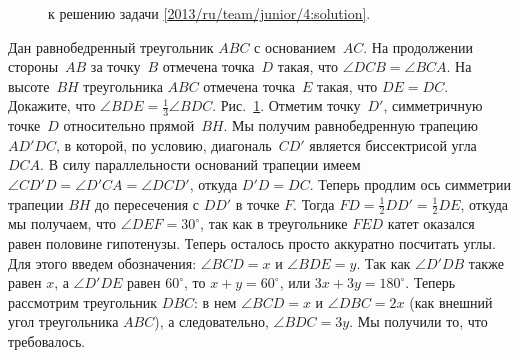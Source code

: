 \ifsolution
\begin{figure}\centering
    \caption{к решению задачи \ref{2013/ru/team/junior/4:solution}.}
    \label{2013/ru/team/junior/4:solution:fig}
\end{figure}%
\fi %

\problem{}
Дан равнобедренный треугольник $ABC$ с основанием~$AC$.
На продолжении стороны~$AB$ за точку~$B$ отмечена точка~$D$ такая, что
$\angle DCB = \angle BCA$.
На высоте~$BH$ треугольника $ABC$ отмечена точка~$E$ такая, что $DE = DC$.
Докажите, что $\angle BDE = \frac{1}{3} \angle BDC$. 
\solution
\label{2013/ru/team/junior/4:solution}%
Рис.~\ref{2013/ru/team/junior/4:solution:fig}.
Отметим точку~$D'$, симметричную точке~$D$ относительно прямой~$BH$.
Мы получим равнобедренную трапецию $AD'DC$, в которой, по условию,
диагональ~$CD'$ является биссектрисой угла $DCA$.
В силу параллельности оснований трапеции имеем
$\angle CD'D = \angle D'CA = \angle DCD'$, откуда $D'D = DC$.
Теперь продлим ось симметрии трапеции $BH$ до пересечения с $DD'$ в точке $F$.
Тогда $FD = \frac{1}{2} DD' = \frac{1}{2} DE$, откуда мы получаем, что
$\angle DEF = 30^\circ$, так как в треугольнике $FED$ катет оказался равен
половине гипотенузы.
Теперь осталось просто аккуратно посчитать углы.
Для этого введем обозначения: $\angle BCD = x$ и $\angle BDE = y$.
Так как $\angle D'DB$ также равен $x$, а $\angle D'DE$ равен $60^\circ$,
то $x + y = 60^\circ$, или $3 x + 3 y = 180^\circ$.
Теперь рассмотрим треугольник $DBC$: в нем $\angle BCD = x$ и
$\angle DBC = 2 x$ (как внешний угол треугольника $ABC$), а следовательно,
$\angle BDC = 3 y$.
Мы получили то, что требовалось.
\endproblem
